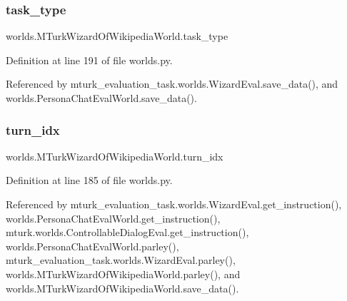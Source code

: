 \subsubsection{\texorpdfstring{task\+\_\+type}{task\_type}}
{\footnotesize\ttfamily worlds.\+M\+Turk\+Wizard\+Of\+Wikipedia\+World.\+task\+\_\+type}



Definition at line 191 of file worlds.\+py.



Referenced by mturk\+\_\+evaluation\+\_\+task.\+worlds.\+Wizard\+Eval.\+save\+\_\+data(), and worlds.\+Persona\+Chat\+Eval\+World.\+save\+\_\+data().

\mbox{\label{classworlds_1_1MTurkWizardOfWikipediaWorld_a90311faeec02a535455cdb10f0d44c42}} 
\subsubsection{\texorpdfstring{turn\+\_\+idx}{turn\_idx}}
{\footnotesize\ttfamily worlds.\+M\+Turk\+Wizard\+Of\+Wikipedia\+World.\+turn\+\_\+idx}



Definition at line 185 of file worlds.\+py.



Referenced by mturk\+\_\+evaluation\+\_\+task.\+worlds.\+Wizard\+Eval.\+get\+\_\+instruction(), worlds.\+Persona\+Chat\+Eval\+World.\+get\+\_\+instruction(), mturk.\+worlds.\+Controllable\+Dialog\+Eval.\+get\+\_\+instruction(), worlds.\+Persona\+Chat\+Eval\+World.\+parley(), mturk\+\_\+evaluation\+\_\+task.\+worlds.\+Wizard\+Eval.\+parley(), worlds.\+M\+Turk\+Wizard\+Of\+Wikipedia\+World.\+parley(), and worlds.\+M\+Turk\+Wizard\+Of\+Wikipedia\+World.\+save\+\_\+data().

\mbox{\label{classworlds_1_1MTurkWizardOfWikipediaWorld_aabcfa4f0477fd7f62392cb2ba91e0ed8}} 
